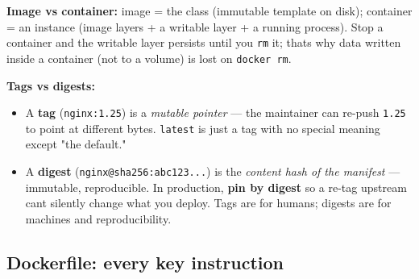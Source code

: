\documentclass[11pt]{article}
\providecommand{\tightlist}{\setlength{\itemsep}{1pt}\setlength{\parskip}{0pt}}
\begin{document}
\textbf{Image vs container:} image = the class (immutable template on disk); container = an instance (image layers + a writable layer + a running process). Stop a container and the writable layer persists until you \texttt{rm} it; that\textquotesingle s why data written inside a container (not to a volume) is lost on \texttt{docker\ rm}.

\textbf{Tags vs digests:}

\begin{itemize}
\tightlist
\item
  A \textbf{tag} (\texttt{nginx:1.25}) is a \emph{mutable pointer} --- the maintainer can re-push \texttt{1.25} to point at different bytes. \texttt{latest} is just a tag with no special meaning except "the default."
\item
  A \textbf{digest} (\texttt{nginx@sha256:abc123...}) is the \emph{content hash of the manifest} --- immutable, reproducible. In production, \textbf{pin by digest} so a re-tag upstream can\textquotesingle t silently change what you deploy. Tags are for humans; digests are for machines and reproducibility.
\end{itemize}

\subsection{Dockerfile: every key instruction}\label{dockerfile-every-key-instruction}

\end{document}
